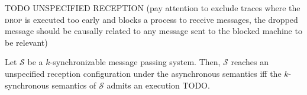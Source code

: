 TODO UNSPECIFIED RECEPTION (pay attention to exclude traces where the \textsc{drop} is executed too early and blocks a process to receive messages, the dropped message should be causally related to any message sent to the blocked machine to be relevant)

\begin{theorem}
Let $\mathcal{S}$ be a $k$-synchronizable message passing system. Then, $\mathcal{S}$ reaches an unspecified reception configuration under the asynchronous semantics iff the $k$-synchronous semantics of $\mathcal{S}$ admits an execution TODO.
\end{theorem}

